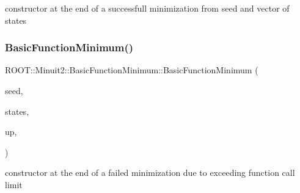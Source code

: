 constructor at the end of a successfull minimization from seed and vector of states 

\mbox{\label{classROOT_1_1Minuit2_1_1BasicFunctionMinimum_a2a15d2336acfb9f3be41de8e477c191a}} 
\subsubsection{\texorpdfstring{BasicFunctionMinimum()}{BasicFunctionMinimum()}\hspace{0.1cm}{\footnotesize\ttfamily [8/10]}}
{\footnotesize\ttfamily R\+O\+O\+T\+::\+Minuit2\+::\+Basic\+Function\+Minimum\+::\+Basic\+Function\+Minimum (\begin{DoxyParamCaption}\item[{const \mbox{\hyperlink{classROOT_1_1Minuit2_1_1MinimumSeed}{Minimum\+Seed}} \&}]{seed,  }\item[{const std\+::vector$<$ \mbox{\hyperlink{classROOT_1_1Minuit2_1_1MinimumState}{Minimum\+State}} $>$ \&}]{states,  }\item[{double}]{up,  }\item[{\mbox{\hyperlink{classROOT_1_1Minuit2_1_1BasicFunctionMinimum_1_1MnReachedCallLimit}{Mn\+Reached\+Call\+Limit}}}]{ }\end{DoxyParamCaption})\hspace{0.3cm}{\ttfamily [inline]}}



constructor at the end of a failed minimization due to exceeding function call limit 

\mbox{\label{classROOT_1_1Minuit2_1_1BasicFunctionMinimum_ae30a460175a2bbf715f3ee0d6092c8b6}} 
